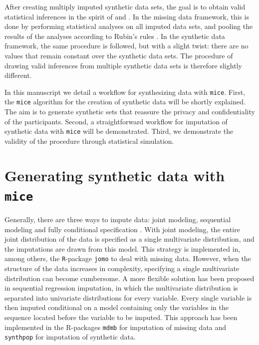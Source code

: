 \documentclass[psych,article,submit,moreauthors,pdftex]{mdpi}
\begin{document}
After creating multiply imputed synthetic data sets, the goal is to
obtain valid statistical inferences in the spirit of
\citet{rubin_multiple_1987} and \citet{neyman1934}. In the missing data
framework, this is done by performing statistical analyses on all
imputed data sets, and pooling the results of the analyses according to
Rubin's rules \citep[p.~76]{rubin_multiple_1987}. In the synthetic data
framework, the same procedure is followed, but with a slight twist:
there are no values that remain constant over the synthetic data sets.
The procedure of drawing valid inferences from multiple synthetic data
sets is therefore slightly different.

In this manuscript we detail a workflow for synthesizing data with
\texttt{mice}. First, the \texttt{mice} algorithm for the creation of
synthetic data will be shortly explained. The aim is to generate
synthetic sets that reassure the privacy and confidentiality of the
participants. Second, a straightforward workflow for imputation of
synthetic data with \texttt{mice} will be demonstrated. Third, we
demonstrate the validity of the procedure through statistical
simulation.

\hypertarget{generating-synthetic-data-with-mice}{%
\section{\texorpdfstring{Generating synthetic data with
\texttt{mice}}{Generating synthetic data with mice}}\label{generating-synthetic-data-with-mice}}

Generally, there are three ways to impute data: joint modeling,
sequential modeling and fully conditional specification
\citep{murray_multiple_2018, ludtke2020regression, grund2021using}. With
joint modeling, the entire joint distribution of the data is specified
as a single multivariate distribution, and the imputations are drawn
from this model. This strategy is implemented in, among others, the
\texttt{R}-package \texttt{jomo} \citep{jomo} to deal with missing data.
However, when the structure of the data increases in complexity,
specifying a single multivariate distribution can become cumbersome. A
more flexible solution has been proposed in sequential regression
imputation, in which the multivariate distribution is separated into
univariate distributions for every variable. Every single variable is
then imputed conditional on a model containing only the variables in the
sequence located before the variable to be imputed. This approach has
been implemented in the R-packages \texttt{mdmb} \citep{mdmb} for
imputation of missing data and \texttt{synthpop} \citep{synthpop} for
imputation of synthetic data.
\end{document}
